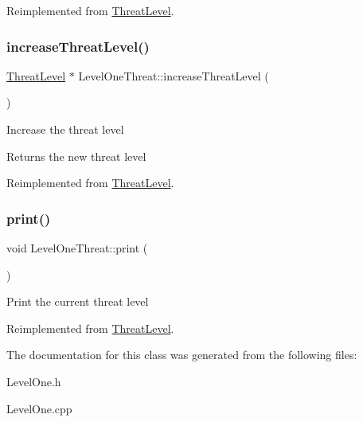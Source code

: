 Reimplemented from \hyperlink{classThreatLevel_a3545ec161fbe4c01beafb9b43624c7e8}{Threat\+Level}.

\mbox{\label{classLevelOneThreat_afc68f742f1101cb8d533d8cec21bac3f}} 
\subsubsection{\texorpdfstring{increase\+Threat\+Level()}{increaseThreatLevel()}}
{\footnotesize\ttfamily \hyperlink{classThreatLevel}{Threat\+Level} $\ast$ Level\+One\+Threat\+::increase\+Threat\+Level (\begin{DoxyParamCaption}{ }\end{DoxyParamCaption})\hspace{0.3cm}{\ttfamily [virtual]}}

Increase the threat level \begin{DoxyReturn}{Returns}
the new threat level 
\end{DoxyReturn}


Reimplemented from \hyperlink{classThreatLevel_ae18f6ebe2186ae1b61d4817196f969e3}{Threat\+Level}.

\mbox{\label{classLevelOneThreat_a902492d8341a398b0209fb89e2aca68e}} 
\subsubsection{\texorpdfstring{print()}{print()}}
{\footnotesize\ttfamily void Level\+One\+Threat\+::print (\begin{DoxyParamCaption}{ }\end{DoxyParamCaption})\hspace{0.3cm}{\ttfamily [virtual]}}

Print the current threat level 

Reimplemented from \hyperlink{classThreatLevel_a5bdff5eeffed8db616ca06091097c138}{Threat\+Level}.



The documentation for this class was generated from the following files\+:\begin{DoxyCompactItemize}
\item 
Level\+One.\+h\item 
Level\+One.\+cpp\end{DoxyCompactItemize}
